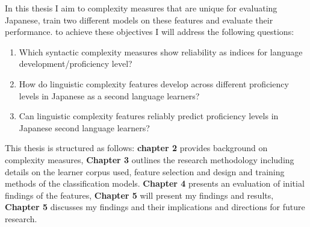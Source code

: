 In this thesis I aim to complexity measures that are unique for evaluating Japanese, train two different models on these features and evaluate their performance. to achieve these objectives I will address the following questions:
\begin{enumerate}
    \item Which syntactic complexity measures show reliability as indices for language development/proficiency level?
    \item How do linguistic complexity features develop across different proficiency levels in Japanese as a second language learners?
    \item Can linguistic complexity features reliably predict proficiency levels in Japanese second language learners?
\end{enumerate}

This thesis is structured as follows: \textbf{chapter 2} provides background on complexity measures, \textbf{Chapter 3} outlines the research methodology including details on the learner corpus used, feature selection and design and training methods of the
classification models. \textbf{Chapter 4} presents an evaluation of initial findings of the features,
\textbf{Chapter 5 }will present my findings and results, \textbf{Chapter 5} discusses my
findings and their implications and directions for future research.